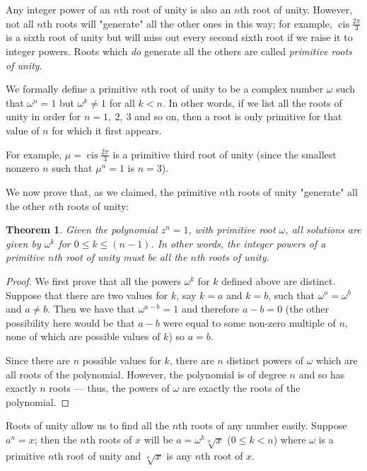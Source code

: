 \documentclass[a4paper,10pt,titlepage]{article}
\newtheorem*{thm}{Theorem}
\theoremstyle{definition}
\DeclareMathOperator{\cis}{cis}
\begin{document}
Any integer power of an $n$th root of unity is also an $n$th root of unity. However, not
all $ n$th roots will "generate" all the other ones in this way; for example, $ \cis \frac{2\pi}{3} $
is a sixth root of unity but will miss out every second sixth root if we raise it to integer
powers. Roots which \emph{do} generate all the others are called \emph{primitive roots of unity}.

We formally define a primitive $n$th root of unity to be a complex number $ \omega $ such that $ \omega^n = 1$
but $ \omega^k \neq 1 $ for all $ k < n $. In other words, if we list all the roots of unity in order for $ n = 1,~2,~3 $
and so on, then a root is only primitive for that value of $ n $ for which it first appears.

For example, $ \mu = \cis \frac{2\pi}{3} $ is a primitive third root of unity (since the smallest
nonzero $ n $ such that $ \mu^n = 1 $ is $ n = 3 $).

We now prove that, as we claimed, the primitive $n$th roots of unity "generate" all the other
$ n$th roots of unity:
\begin{thm}
  Given the polynomial $ z^n = 1 $, with primitive root $ \omega $, all solutions
  are given by $ \omega^k $ for $ 0 \leq k \leq (n - 1) $. In other words,
  the integer powers of a primitive $ n$th root of unity must be \emph{all} the
  $n$th roots of unity.
\end{thm}

\begin{proof}
  We first prove that all the powers $ \omega^k $ for $ k $ defined above are distinct.
  Suppose that there are two values for $ k $, say
  $ k = a $ and $ k = b $, such that $ \omega^a = \omega^b $ and $ a \neq b $. Then we have
  that $ \omega^{a-b} = 1 $ and therefore $ a - b = 0 $ (the other possibility here would be
  that $ a - b $ were equal to some non-zero multiple of $ n $, none of which are possible
  values of $ k $) so $ a = b $.

  Since there are $ n $ possible values for $ k $, there are $ n $ distinct powers of $ \omega $
  which are all roots of the polynomial. However, the polynomial is of degree $ n $ and so has
  exactly $ n $ roots --- thus, the powers of $ \omega $ are exactly the roots of the polynomial.
\end{proof}

Roots of unity allow us to find all the $ n$th roots of any number easily. Suppose $ a^n = x $; then
the $ n$th roots of $ x $ will be $ a = \omega^k \sqrt[n]{x} $ ($ 0 \leq k < n $) where $ \omega $ is a
primitive $ n$th root of unity and $ \sqrt[n]{x} $ is any $ n$th root of $ x $.
\end{document}
